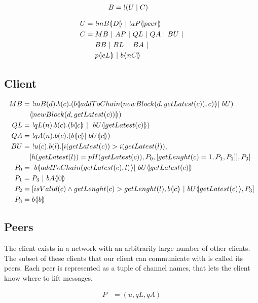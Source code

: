 \begin{align*}
	B &=\ !(U\mid C)
\end{align*}

\begin{align*}
    U &=\ !mB \lift{}{D}\ |\ !aP\lift{}{peer}\\
    C &= MB\ |\ AP\ |\ QL\ |\ QA\ |\ BU\ |\\
    &\quad \ BB\ |\ BL\ |\ \ BA\ |\\
    &\quad \ p\lift{}{eL}\ |\ b\lift{}{nC}
\end{align*}

\subsection{Client}

\begin{align*}
    MB &=\ !mB(d).b(c).(b \lift{}{addToChain(newBlock(d,getLatest(c)),c)}| \ bU)\\
    &\quad \lift{}{newBlock(d, getLatest(c))})\\
    QL &=\ !qL(n).b(c).(b \lift{}{c}\ |\ \ bU\lift{}{getLatest(c)})\\
    QA &=\ !qA(n).b(c).(b\lift{}{c}| \ bU\lift{}{c})\\
    BU &=\ !u(c).b(l).[i( getLatest(c))>i(getLatest(l)),\\
    &\quad[h(getLatest( l))=pH(getLatest(c)),P_0, [getLenght(c)=1,P_1,P_1]],P_3]\\
    P_0 &=\ b\lift{}{addToChain(getLatest(c),l)}| \ bU\lift{}{getLatest(c)}\\
    P_1 &= P_3\ |\ bA \lift{}{0}\\
    P_2 &= [isValid(c) \land getLenght(c) > getLenght(l), b\lift{}{c}\ |\ bU \lift{}{getLatest(c)},P_3]\\
    P_3 &= b\lift{}{b}
\end{align*}

\subsection{Peers}
The client exists in a network with an arbitrarily large number of other clients.
The subset of these clients that our client can communicate with is called its peers.
Each peer is represented as a tuple of channel names, that lets the client know where to lift messages.

\begin{align*}
    P &= (u, qL, qA)
\end{align*}

